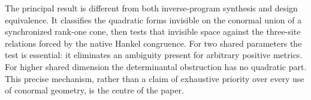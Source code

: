 The principal result is different from both inverse-program synthesis and design equivalence. It classifies the quadratic forms invisible on the conormal union of a synchronized rank-one cone, then tests that invisible space against the three-site relations forced by the native Hankel congruence. For two shared parameters the test is essential: it eliminates an ambiguity present for arbitrary positive metrics. For higher shared dimension the determinantal obstruction has no quadratic part. This precise mechanism, rather than a claim of exhaustive priority over every use of conormal geometry, is the centre of the paper.
